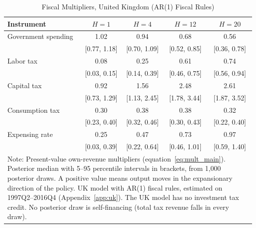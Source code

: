 \begin{table}[ht]
\centering
\caption{Fiscal Multipliers, United Kingdom (AR(1) Fiscal Rules)}
\label{tab:mult_uk}
\begin{tabular}{lcccc}
\hline\hline
Instrument & $H=1$ & $H=4$ & $H=12$ & $H=20$ \\
\hline
Government spending      & 1.02 & 0.94 & 0.68 & 0.56 \\
                         & [0.77, 1.18] & [0.70, 1.09] & [0.52, 0.85] & [0.36, 0.78] \\
Labor tax                & 0.08 & 0.25 & 0.61 & 0.74 \\
                         & [0.03, 0.15] & [0.14, 0.39] & [0.46, 0.75] & [0.56, 0.94] \\
Capital tax              & 0.92 & 1.56 & 2.48 & 2.61 \\
                         & [0.73, 1.29] & [1.13, 2.45] & [1.78, 3.44] & [1.87, 3.52] \\
Consumption tax          & 0.30 & 0.38 & 0.38 & 0.32 \\
                         & [0.23, 0.40] & [0.32, 0.46] & [0.30, 0.43] & [0.22, 0.40] \\
Expensing rate           & 0.25 & 0.47 & 0.73 & 0.97 \\
                         & [0.03, 0.39] & [0.22, 0.64] & [0.46, 1.01] & [0.59, 1.40] \\
\hline\hline
\multicolumn{5}{p{0.85\textwidth}}{\footnotesize Note: Present-value own-revenue multipliers (equation~\ref{eq:mult_main}). Posterior median with 5--95 percentile intervals in brackets, from 1{,}000 posterior draws. A positive value means output moves in the expansionary direction of the policy. UK model with AR(1) fiscal rules, estimated on 1997Q2--2016Q4 (Appendix~\ref{app:uk}). The UK model has no investment tax credit. No posterior draw is self-financing (total tax revenue falls in every draw).}
\end{tabular}
\end{table}
